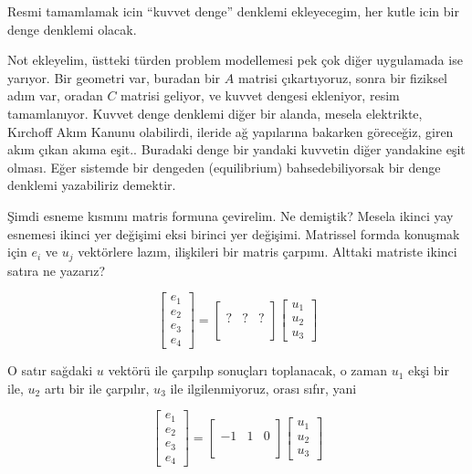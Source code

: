 \documentclass[12pt,fleqn]{article}\usepackage{../../common}
\begin{document}
Resmi tamamlamak icin ``kuvvet denge'' denklemi ekleyecegim, her kutle
icin bir denge denklemi olacak.

Not ekleyelim, üstteki türden problem modellemesi pek çok diğer uygulamada ise
yarıyor. Bir geometri var, buradan bir $A$ matrisi çıkartıyoruz, sonra bir
fiziksel adım var, oradan $C$ matrisi geliyor, ve kuvvet dengesi ekleniyor,
resim tamamlanıyor. Kuvvet denge denklemi diğer bir alanda, mesela elektrikte,
Kırchoff Akım Kanunu olabilirdi, ileride ağ yapılarına bakarken göreceğiz, giren
akım çıkan akıma eşit.. Buradaki denge bir yandaki kuvvetin diğer yandakine eşit
olması. Eğer sistemde bir dengeden (equilibrium) bahsedebiliyorsak bir denge
denklemi yazabiliriz demektir.

Şimdi esneme kısmını matris formuna çevirelim. Ne demiştik? Mesela ikinci yay
esnemesi ikinci yer değişimi eksi birinci yer değişimi. Matrissel formda
konuşmak için $e_i$ ve $u_j$  vektörlere lazım, ilişkileri bir matris çarpımı.
Alttaki matriste ikinci satıra ne yazarız?

$$
\left[\begin{array}{c}
e_1 \\ e_2 \\ e_3 \\ e_4
\end{array}\right] =
\left[\begin{array}{cccc}
 & & \\ ? & ? & ? \\  & & \\  & & 
\end{array}\right]
\left[\begin{array}{c}
u_1 \\ u_2 \\ u_3 
\end{array}\right]
$$

O satır sağdaki $u$ vektörü ile çarpılıp sonuçları toplanacak, o zaman
$u_1$ ekşi bir ile, $u_2$ artı bir ile çarpılır, $u_3$ ile ilgilenmiyoruz,
orası sıfır, yani

$$
\left[\begin{array}{c}
e_1 \\ e_2 \\ e_3 \\ e_4
\end{array}\right] =
\left[\begin{array}{cccc}
 & & \\ -1 & 1 & 0 \\  & & \\  & & 
\end{array}\right]
\left[\begin{array}{c}
u_1 \\ u_2 \\ u_3 
\end{array}\right]
$$
\end{document}
